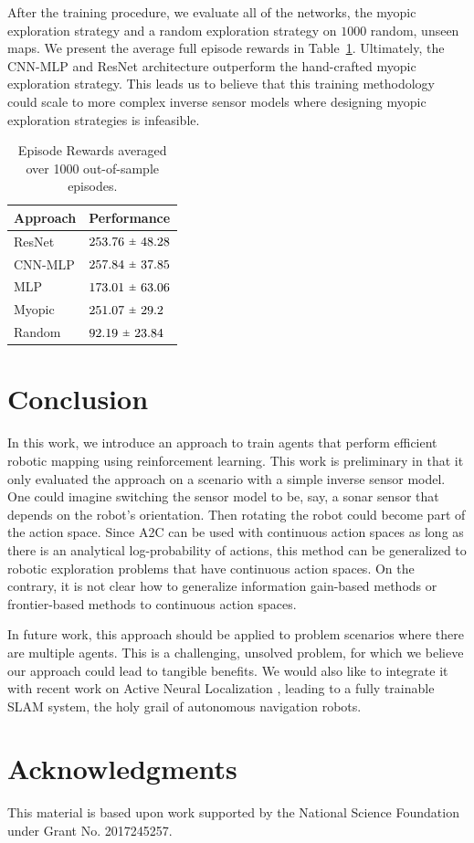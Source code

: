 \documentclass{article}
\newcommand{\rpm}{\raisebox{.2ex}{$\scriptstyle\pm$}}
\begin{document}
After the training procedure, we evaluate all of the networks, the myopic exploration strategy and a random exploration strategy on $1000$ random, unseen maps. We present the average full episode rewards in Table~\ref{tab:results}. Ultimately, the CNN-MLP and ResNet architecture outperform the hand-crafted myopic exploration strategy. This leads us to believe that this training methodology could scale to more complex inverse sensor models where designing myopic exploration strategies is infeasible.

\begin{table}[H]
  \caption{Episode Rewards averaged over 1000 out-of-sample episodes.}
  \label{tab:results}
  \centering
  \begin{tabular}{ll}
    \toprule
    Approach & Performance \\
    \midrule
    ResNet   & $253.76 \ \rpm \ 48.28$  \\
    CNN-MLP  & $257.84 \ \rpm \ 37.85$ \\
    MLP      & $173.01 \ \rpm \ 63.06$ \\
    Myopic   & $251.07 \ \rpm \ 29.2$ \\
    Random   & $92.19 \ \rpm \ 23.84$ \\
    \bottomrule
  \end{tabular}
\end{table}

\section{Conclusion}

In this work, we introduce an approach to train agents that perform efficient robotic mapping using reinforcement learning. This work is preliminary in that it only evaluated the approach on a scenario with a simple inverse sensor model. One could imagine switching the sensor model to be, say, a sonar sensor that depends on the robot's orientation. Then rotating the robot could become part of the action space. Since A2C can be used with continuous action spaces as long as there is an analytical log-probability of actions, this method can be generalized to robotic exploration problems that have continuous action spaces. On the contrary, it is not clear how to generalize information gain-based methods or frontier-based methods to continuous action spaces.

In future work, this approach should be applied to problem scenarios where there are multiple agents. This is a challenging, unsolved problem, for which we believe our approach could lead to tangible benefits. We would also like to integrate it with recent work on Active Neural Localization \cite{nal}, leading to a fully trainable SLAM system, the holy grail of autonomous navigation robots.

\section*{Acknowledgments}

This material is based upon work supported by the National Science Foundation under Grant No. 2017245257.

{}


\appendix
\end{document}
